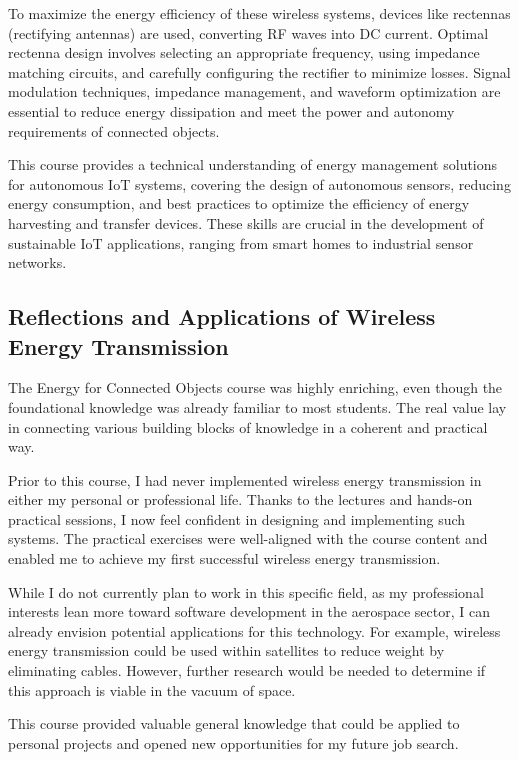 To maximize the energy efficiency of these wireless systems, devices like rectennas (rectifying antennas) are used, converting RF waves into DC current. Optimal rectenna design involves selecting an appropriate frequency, using impedance matching circuits, and carefully configuring the rectifier to minimize losses. Signal modulation techniques, impedance management, and waveform optimization are essential to reduce energy dissipation and meet the power and autonomy requirements of connected objects.

This course provides a technical understanding of energy management solutions for autonomous IoT systems, covering the design of autonomous sensors, reducing energy consumption, and best practices to optimize the efficiency of energy harvesting and transfer devices. These skills are crucial in the development of sustainable IoT applications, ranging from smart homes to industrial sensor networks.


\subsection{Reflections and Applications of Wireless Energy Transmission}

The Energy for Connected Objects course was highly enriching, even though the foundational knowledge was already familiar to most students. The real value lay in connecting various building blocks of knowledge in a coherent and practical way.

Prior to this course, I had never implemented wireless energy transmission in either my personal or professional life. Thanks to the lectures and hands-on practical sessions, I now feel confident in designing and implementing such systems. The practical exercises were well-aligned with the course content and enabled me to achieve my first successful wireless energy transmission.

While I do not currently plan to work in this specific field, as my professional interests lean more toward software development in the aerospace sector, I can already envision potential applications for this technology. For example, wireless energy transmission could be used within satellites to reduce weight by eliminating cables. However, further research would be needed to determine if this approach is viable in the vacuum of space.

This course provided valuable general knowledge that could be applied to personal projects and opened new opportunities for my future job search.

